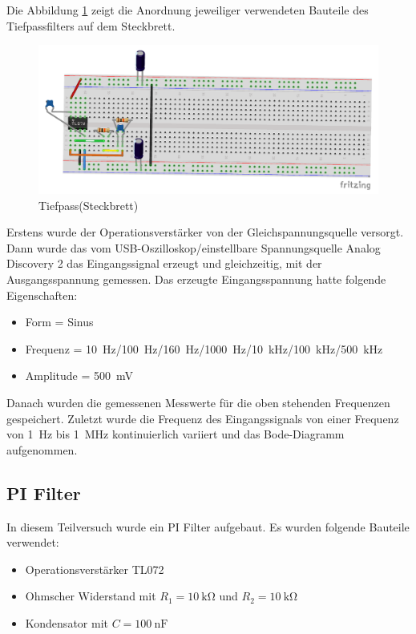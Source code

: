Die Abbildung \ref{fig:Steckbrett_Tiefpass} zeigt die Anordnung jeweiliger verwendeten Bauteile des Tiefpassfilters auf dem Steckbrett.

\begin{figure}[H]
  \centering
  \includegraphics[width=0.5\linewidth]{Elektronik-Laborprotokoll_Filter/Abbildungen/Steckbrett_Bilder/Steckbrett_Tiefpass.pdf}
  \caption{Tiefpass(Steckbrett)}
  \label{fig:Steckbrett_Tiefpass}
\end{figure}

Erstens wurde der Operationsverstärker von der Gleichspannungsquelle versorgt. Dann wurde das vom USB-Oszilloskop/einstellbare Spannungsquelle Analog Discovery 2 das Eingangssignal erzeugt und gleichzeitig, mit der Ausgangsspannung gemessen. Das erzeugte Eingangsspannung hatte folgende Eigenschaften:
\begin{itemize}
    \item Form = Sinus 
    \item Frequenz = \SI{10}{\hertz}/\SI{100}{\hertz}/\SI{160}{\hertz}/\SI{1000}{\hertz}/\SI{10}{\kilo\hertz}/\SI{100}{\kilo\hertz}/\SI{500}{\kilo\hertz}
    \item Amplitude = \SI{500}{\milli\volt}
\end{itemize}
    Danach wurden die gemessenen Messwerte für die oben stehenden Frequenzen gespeichert. Zuletzt wurde die Frequenz des Eingangssignals von einer Frequenz von \SI{1}{\hertz} bis \SI{1}{\mega\hertz} kontinuierlich variiert und das Bode-Diagramm aufgenommen.
%
\subsection{PI Filter}
In diesem Teilversuch wurde ein PI Filter aufgebaut.
Es wurden folgende Bauteile verwendet:%
%
\begin{itemize}
    \item Operationsverstärker TL072
    \item Ohmscher Widerstand mit $R_1=\SI{10}{\kilo\ohm}$ und $R_2=\SI{10}{\kilo\ohm}$
    \item Kondensator mit $C=\SI{100}{\nano\farad}$
\end{itemize}

